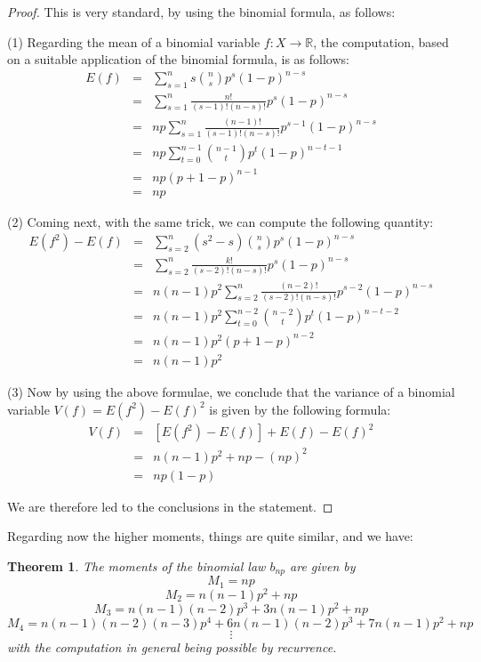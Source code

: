 \documentclass[12pt]{amsbook}
\newtheorem{theorem}{Theorem}[chapter]
\begin{document}
\begin{proof}
This is very standard, by using the binomial formula, as follows:

\medskip

(1) Regarding the mean of a binomial variable $f:X\to\mathbb R$, the computation, based on a suitable application of the binomial formula, is as follows:
\begin{eqnarray*}
E(f)
&=&\sum_{s=1}^ns\binom{n}{s}p^s(1-p)^{n-s}\\
&=&\sum_{s=1}^n\frac{n!}{(s-1)!(n-s)!}p^s(1-p)^{n-s}\\
&=&np\sum_{s=1}^n\frac{(n-1)!}{(s-1)!(n-s)!}p^{s-1}(1-p)^{n-s}\\
&=&np\sum_{t=0}^{n-1}\binom{n-1}{t}p^t(1-p)^{n-t-1}\\
&=&np(p+1-p)^{n-1}\\
&=&np
\end{eqnarray*}

(2) Coming next, with the same trick, we can compute the following quantity:
\begin{eqnarray*}
E(f^2)-E(f)
&=&\sum_{s=2}^n(s^2-s)\binom{n}{s}p^s(1-p)^{n-s}\\
&=&\sum_{s=2}^n\frac{k!}{(s-2)!(n-s)!}p^s(1-p)^{n-s}\\
&=&n(n-1)p^2\sum_{s=2}^n\frac{(n-2)!}{(s-2)!(n-s)!}p^{s-2}(1-p)^{n-s}\\
&=&n(n-1)p^2\sum_{t=0}^{n-2}\binom{n-2}{t}p^t(1-p)^{n-t-2}\\
&=&n(n-1)p^2(p+1-p)^{n-2}\\
&=&n(n-1)p^2
\end{eqnarray*}

(3) Now by using the above formulae, we conclude that the variance of a binomial variable $V(f)=E(f^2)-E(f)^2$ is given by the following formula:
\begin{eqnarray*}
V(f)
&=&[E(f^2)-E(f)]+E(f)-E(f)^2\\
&=&n(n-1)p^2+np-(np)^2\\
&=&np(1-p)
\end{eqnarray*}

We are therefore led to the conclusions in the statement.
\end{proof}

Regarding now the higher moments, things are quite similar, and we have:

\begin{theorem}
The moments of the binomial law $b_{np}$ are given by
$$M_1=np$$
$$M_2=n(n-1)p^2+np$$
$$M_3=n(n-1)(n-2)p^3+3n(n-1)p^2+np$$
$$M_4=n(n-1)(n-2)(n-3)p^4+6n(n-1)(n-2)p^3+7n(n-1)p^2+np$$
$$\vdots$$
with the computation in general being possible by recurrence.
\end{theorem}
\end{document}
